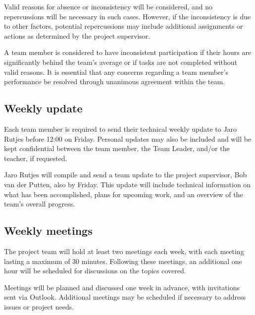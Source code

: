 \documentclass{projdoc}
\begin{document}
Valid reasons for absence or inconsistency will be considered, and no 
repercussions will be necessary in such cases. However, if the inconsistency 
is due to other factors, potential repercussions may include additional 
assignments or actions as determined by the project supervisor.

A team member is considered to have inconsistent participation if their hours 
are significantly behind the team’s average or if tasks are not completed 
without valid reasons. It is essential that any concerns regarding a team 
member's performance be resolved through unanimous agreement within the team.


\subsection{Weekly update}
Each team member is required to send their technical weekly update to Jaro 
Rutjes before 12:00 on Friday. Personal updates may also be included and will be kept 
confidential between the team member, the Team Leader, and/or the teacher, 
if requested.

Jaro Rutjes will compile and send a team update to the project supervisor,
Bob van der Putten, also by Friday. This update will include technical 
information on what has been accomplished, plans for upcoming work, and an 
overview of the team's overall progress.

\subsection{Weekly meetings}
The project team will hold at least two meetings each week, with each meeting 
lasting a maximum of 30 minutes. Following these meetings, an additional one 
hour will be scheduled for discussions on the topics covered.

Meetings will be planned and discussed one week in advance, with invitations 
sent via Outlook. Additional meetings may be scheduled if necessary to address 
issues or project needs.


\newpage
\end{document}
